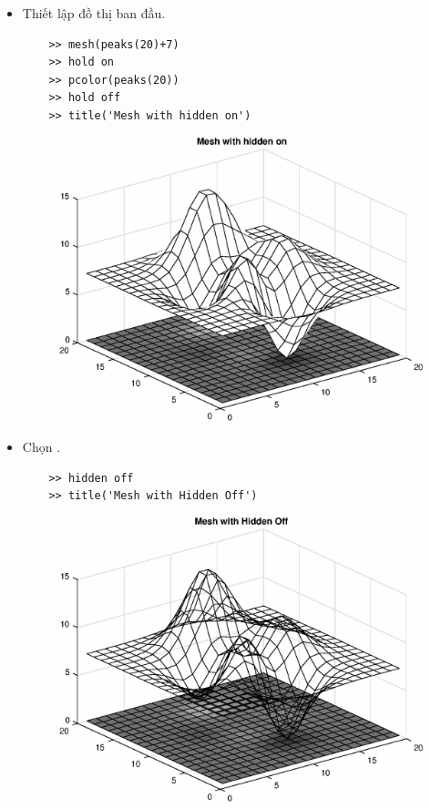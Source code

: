 \documentclass[12pt,a4paper]{article}
\begin{document}
\begin{itemize}
	\item Thiết lập đồ thị ban đầu.
\begin{lstlisting}
	>> mesh(peaks(20)+7)
	>> hold on
	>> pcolor(peaks(20))
	>> hold off
	>> title('Mesh with hidden on')
\end{lstlisting}
\begin{center}
	\begin{figure}[H]
	\begin{center}
		\includegraphics[scale=0.6]{hinhtieuluan/dothi21}
	\end{center}
		\caption{}
		\label{refdothi21}
	\end{figure}
\end{center}
	\item Chọn .
\begin{lstlisting}
	>> hidden off
	>> title('Mesh with Hidden Off')
\end{lstlisting}
\begin{center}
	\begin{figure}[H]
	\begin{center}
		\includegraphics[scale=0.6]{hinhtieuluan/dothi22}

\end{center}
\end{figure}
\end{center}
\end{itemize}
\end{document}
